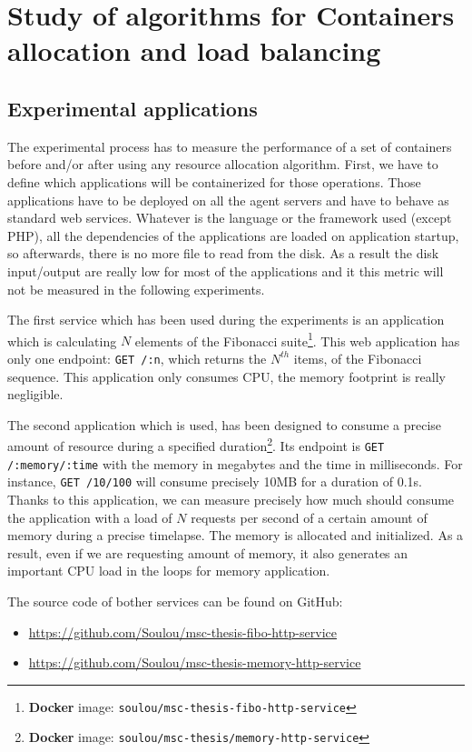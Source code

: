 \chapter{Study of algorithms for Containers allocation and load balancing}
\label{chapt:containerloadbalance}

\section{Experimental applications}

The experimental process has to measure the performance of a set of containers
before and/or after using any resource allocation algorithm. First, we have to
define which applications will be containerized for those operations. Those
applications have to be deployed on all the agent servers and have to behave as
standard web services. Whatever is the language or the framework used (except
PHP), all the dependencies of the applications are loaded on application
startup, so afterwards, there is no more file to read from the disk.  As a
result the disk input/output are really low for most of the applications and it
this metric will not be measured in the following experiments.

The first service which has been used during the experiments is an application which
is calculating $N$ elements of the Fibonacci suite\footnote{\textbf{Docker}
image: \texttt{soulou/msc-thesis-fibo-http-service}}. This web application has
only one endpoint: \texttt{GET /:n}, which returns the $N^{th}$ items, of the
Fibonacci sequence. This application only consumes CPU, the memory footprint is
really negligible.

The second application which is used, has been designed to consume a precise
amount of resource during a specified duration\footnote{\textbf{Docker} image:
\texttt{soulou/msc-thesis/memory-http-service}}. Its endpoint is \texttt{GET
/:memory/:time} with the memory in megabytes and the time in milliseconds. For
instance, \texttt{GET /10/100} will consume precisely 10MB for a duration of
0.1s. Thanks to this application, we can measure precisely how much should
consume the application with a load of $N$ requests per second of a certain
amount of memory during a precise timelapse.
The memory is allocated and initialized. As a result, even if we are requesting
amount of memory, it also generates an important CPU load in the loops for memory
application.

The source code of bother services can be found on GitHub:
\begin{itemize}
\item{\url{https://github.com/Soulou/msc-thesis-fibo-http-service}}
\item{\url{https://github.com/Soulou/msc-thesis-memory-http-service}}
\end{itemize}

